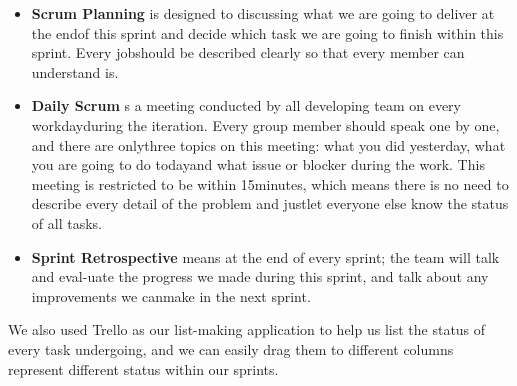 \documentclass[runningheads]{llncs}
\begin{document}
\begin{itemize}
	\item \textbf{Scrum Planning} is designed to discussing what we are going to deliver at the endof this sprint and decide which task we are going to finish within this sprint. Every jobshould be described clearly so that every member can understand is.
	\item \textbf{Daily Scrum} s a meeting conducted by all developing team on every workdayduring the iteration. Every group member should speak one by one, and there are onlythree topics on this meeting: what you did yesterday, what you are going to do todayand what issue or blocker during the work. This meeting is restricted to be within 15minutes, which means there is no need to describe every detail of the problem and justlet everyone else know the status of all tasks.
	\item \textbf{Sprint Retrospective} means at the end of every sprint; the team will talk and eval-uate the progress we made during this sprint, and talk about any improvements we canmake in the next sprint.
\end{itemize}

We also used Trello as our list-making application to help us list the status of every task undergoing, and we can easily drag them to different columns represent different status within our sprints.
\end{document}
